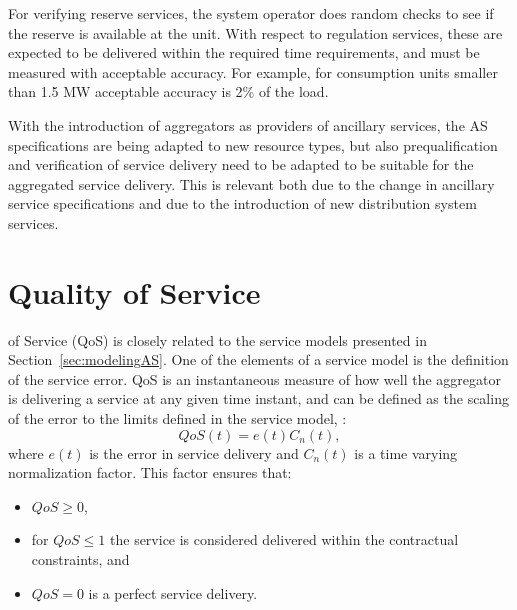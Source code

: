 For verifying reserve services, the system operator does random checks to see if the reserve is available at the unit. %
With respect to regulation services, these are expected to be delivered within the required time requirements, and must be measured with acceptable accuracy. For example, for consumption units smaller than 1.5 MW acceptable accuracy is 2\% of the load.

With the introduction of aggregators as providers of ancillary services, the AS specifications are being adapted to new resource types, but also prequalification and verification of service delivery need to be adapted to be suitable for the aggregated service delivery. This is relevant both due to the change in ancillary service specifications and due to the introduction of new distribution system services.


\section{Quality of Service}\label{sec:MAINQoS}
 of Service (QoS) is closely related to the service models presented in Section~\ref{sec:modelingAS}. One of the elements of a service model is the definition of the service error. QoS is an instantaneous measure of how well the aggregator is delivering a service at any given time instant, and can be defined as the scaling of the error to the limits defined in the service model, \ie:
\begin{equation}
	QoS(t) = e(t)C_n(t),
\end{equation}
where $e(t)$ is the error in service delivery and $C_n(t)$ is a time varying normalization factor. This factor ensures that:
\begin{itemize}
	\item $QoS \geq 0$,
	\item for $QoS \leq 1$ the service is considered delivered within the contractual constraints, and
	\item $QoS = 0$ is a perfect service delivery.
\end{itemize}

